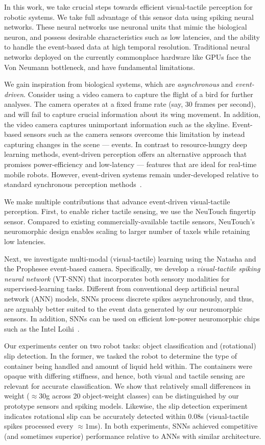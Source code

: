 \documentclass[fyp]{socreport}
\begin{document}
In this work, we take crucial steps towards efficient visual-tactile perception
for robotic systems. We take full advantage of this sensor data using spiking
neural networks. These neural networks use neuronal units that mimic the
biological neuron, and possess desirable characteristics such as low latencies,
and the ability to handle the event-based data at high temporal resolution.
Traditional neural networks deployed on the currently commonplace hardware like
GPUs face the Von Neumann bottleneck, and have fundamental limitations.

We gain inspiration from biological systems, which are \emph{asynchronous} and
\emph{event-driven}. Consider using a video camera to capture the flight of a
bird for further analyses. The camera operates at a fixed frame rate (say, 30
frames per second), and will fail to capture crucial information about its wing
movement. In addition, the video camera captures unimportant information such as
the skyline. Event-based sensors such as the camera sensors overcome this
limitation by instead capturing changes in the scene --- events. In contrast to
resource-hungry deep learning methods, event-driven perception offers an
alternative approach that promises power-efficiency and low-latency --- features
that are ideal for real-time mobile robots. However, event-driven systems remain
under-developed relative to standard synchronous perception
methods~\cite{pfeiffer2018deep}.

We make multiple contributions that advance event-driven visual-tactile
perception. First, to enable richer tactile sensing, we use the NeuTouch
fingertip sensor. Compared to existing commercially-available tactile sensors,
NeuTouch's neuromorphic design enables scaling to larger number of taxels while
retaining low latencies.

Next, we investigate multi-modal (visual-tactile) learning using the Natasha
and the Prophesee event-based camera. Specifically, we develop a
\emph{visual-tactile spiking neural network} (VT-SNN) that incorporates both
sensory modalities for supervised-learning tasks. Different from conventional
deep artificial neural network (ANN) models, SNNs process discrete spikes
asynchronously, and thus, are arguably better suited to the event data generated
by our neuromorphic sensors. In addition, SNNs can be used on efficient
low-power neuromorphic chips such as the Intel Loihi~\cite{davies2018loihi}.

Our experiments center on two robot tasks: object classification and
(rotational) slip detection. In the former, we tasked the robot to determine the
type of container being handled and amount of liquid held within. The containers
were opaque with differing stiffness, and hence, both visual and tactile sensing
are relevant for accurate classification. We show that relatively small
differences in weight ($\approx 30$g across 20 object-weight classes) can be
distinguished by our prototype sensors and spiking models. Likewise, the slip
detection experiment indicates rotational slip can be accurately detected within
$0.08$s (visual-tactile spikes processed every $\approx 1$ms). In both
experiments, SNNs achieved competitive (and sometimes superior) performance
relative to ANNs with similar architecture.
\end{document}
